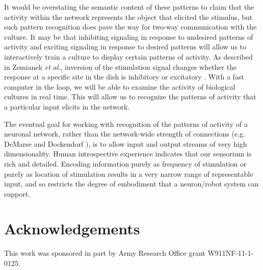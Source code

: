 \documentclass[letterpaper]{article}
\begin{document}
It would be overstating the semantic content of these patterns to claim that the activity within the network represents the object that elicited the stimulus, but such pattern recognition does pave the way for two-way communication with the culture.
It may be that inhibiting signaling in response to undesired patterns of activity and exciting signaling in response to desired patterns will allow us to interactively train a culture to display certain patterns of activity. 
As described in Zemianek \textit{et al}., inversion of the stimulation signal changes whether the response at a specific site in the dish is inhibitory or excitatory .
With a fast computer in the loop, we will be able to examine the activity of biological cultures in real time. 
This will allow us to recognize the patterns of activity that a particular input elicits in the network. 

The eventual goal for working with recognition of the patterns of activity of a neuronal network, rather than the network-wide strength of connections (e.g. DeMarse and Dockendorf ), is to allow input and output streams of very high dimensionality.
Human introspective experience indicates that our sensorium is rich and detailed.
Encoding information purely as frequency of stimulation or purely as location of stimulation results in a very narrow range of representable input, and so restricts the degree of embodiment that a neuron/robot system can support.

\section{Acknowledgements}

This work was sponsored in part by Army Research Office grant W911NF-11-1-0125.




\end{document}
